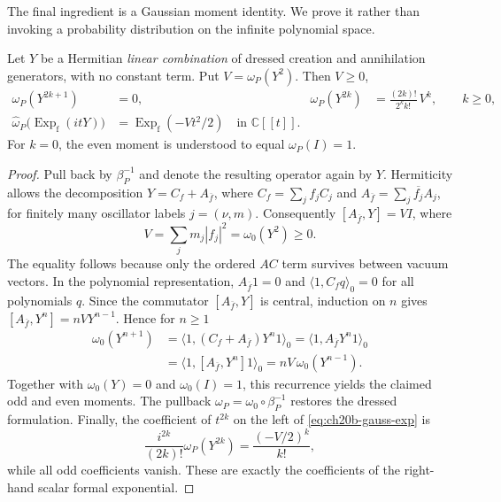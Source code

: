 The final ingredient is a Gaussian moment identity.  We prove it
rather than invoking a probability distribution on the infinite
polynomial space.
\begin{lemma}
\label{lem:ch20b-wick}
Let \(Y\) be a Hermitian \emph{linear combination} of dressed
creation and annihilation generators, with no constant term.  Put
\(V=\omega_P(Y^2)\).  Then \(V\geq0\),
\begin{align}
 \omega_P(Y^{2k+1})&=0,
 &\omega_P(Y^{2k})&=\frac{(2k)!}{2^k k!}\,V^k,
 \qquad k\geq0,
 \label{eq:ch20b-gauss-moments}\\
 \widehat\omega_P\bigl(\operatorname{Exp}_{\mathrm f}(itY)\bigr)
 &=\operatorname{Exp}_{\mathrm f}(-Vt^2/2)
 \quad\text{in }\mathbb C[[t]].
 \label{eq:ch20b-gauss-exp}
\end{align}
For \(k=0\), the even moment is understood to equal \(\omega_P(I)=1\).
\end{lemma}
\begin{proof}
Pull back by \(\beta_P^{-1}\) and denote the resulting operator
again by \(Y\).  Hermiticity allows the decomposition
\(Y=C_f+A_{\overline f}\), where
\(C_f=\sum_j f_jC_j\) and
\(A_{\overline f}=\sum_j\overline{f_j}A_j\), for finitely many
oscillator labels \(j=(\nu,m)\).  Consequently
\([A_{\overline f},Y]=V I\), where
\begin{equation}
 V=\sum_j m_j|f_j|^2
   =\omega_0(Y^2)\geq0.
 \label{eq:ch20b-GaussianV}
\end{equation}
The equality follows because only the ordered \(AC\) term survives
between vacuum vectors.  In the polynomial representation,
\(A_{\overline f}1=0\) and
\(\langle1,C_fq\rangle_0=0\) for all polynomials \(q\).
Since the commutator \([A_{\overline f},Y]\) is central, induction on
\(n\) gives \([A_{\overline f},Y^n]=nVY^{n-1}\).  Hence for
\(n\geq1\)
\begin{align*}
 \omega_0(Y^{n+1})
 &=\langle1,(C_f+A_{\overline f})Y^n1\rangle_0
 =\langle1,A_{\overline f}Y^n1\rangle_0\\
 &=\langle1,[A_{\overline f},Y^n]1\rangle_0
 =nV\,\omega_0(Y^{n-1}).
\end{align*}
Together with \(\omega_0(Y)=0\) and \(\omega_0(I)=1\), this
recurrence yields the claimed odd and even moments.  The pullback
\(\omega_P=\omega_0\circ\beta_P^{-1}\) restores the dressed formulation.
Finally, the coefficient of \(t^{2k}\) on the left of
\eqref{eq:ch20b-gauss-exp} is
\[
 \frac{i^{2k}}{(2k)!}\omega_P(Y^{2k})
 =\frac{(-V/2)^k}{k!},
\]
while all odd coefficients vanish.  These are exactly the coefficients
of the right-hand scalar formal exponential.
\end{proof}

